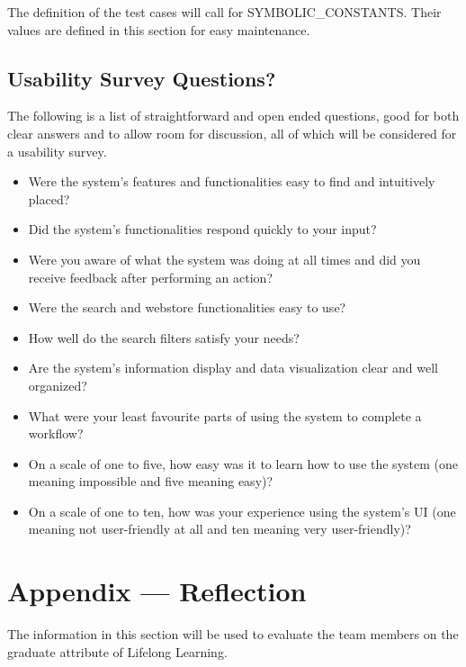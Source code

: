 \documentclass[12pt, titlepage]{article}
\begin{document}
The definition of the test cases will call for SYMBOLIC\_CONSTANTS.
Their values are defined in this section for easy maintenance.

\subsection{Usability Survey Questions?}

\par{The following is a list of straightforward and open ended questions, good for both clear answers and to allow room for discussion, 
all of which will be considered for a usability survey.}

\begin{itemize}
  \item{Were the system's features and functionalities easy to find and intuitively placed?}
  \item{Did the system's functionalities respond quickly to your input?}
  \item{Were you aware of what the system was doing at all times and did you receive feedback after performing an action?}
  \item{Were the search and webstore functionalities easy to use?}
  \item{How well do the search filters satisfy your needs?}
  \item{Are the system's information display and data visualization clear and well organized?}
  \item{What were your least favourite parts of using the system to complete a workflow?}
  \item{On a scale of one to five, how easy was it to learn how to use the system (one meaning impossible and five meaning easy)?}
  \item{On a scale of one to ten, how was your experience using the system's UI (one meaning not user-friendly at all and ten meaning very 
  user-friendly)?}
\end{itemize}


\newpage{}
\section*{Appendix --- Reflection}


The information in this section will be used to evaluate the team members on the
graduate attribute of Lifelong Learning.
\end{document}
